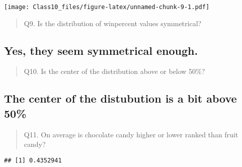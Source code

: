 \documentclass[
]{article}
\newenvironment{Shaded}{\begin{snugshade}}{\end{snugshade}}
\newcommand{\FunctionTok}[1]{\textcolor[rgb]{0.00,0.00,0.00}{#1}}
\newcommand{\NormalTok}[1]{#1}
\newcommand{\SpecialCharTok}[1]{\textcolor[rgb]{0.00,0.00,0.00}{#1}}
\begin{document}
\begin{Shaded}
\end{Shaded}

\texttt{[image: Class10\_files/figure-latex/unnamed-chunk-9-1.pdf]}

\begin{quote}
Q9. Is the distribution of winpercent values symmetrical?
\end{quote}

\hypertarget{yes-they-seem-symmetrical-enough.}{%
\subsection{Yes, they seem symmetrical
enough.}\label{yes-they-seem-symmetrical-enough.}}

\begin{quote}
Q10. Is the center of the distribution above or below 50\%?
\end{quote}

\hypertarget{the-center-of-the-distubution-is-a-bit-above-50}{%
\subsection{The center of the distubution is a bit above
50\%}\label{the-center-of-the-distubution-is-a-bit-above-50}}

\begin{quote}
Q11. On average is chocolate candy higher or lower ranked than fruit
candy?
\end{quote}

\begin{Shaded}
\end{Shaded}

\begin{verbatim}
## [1] 0.4352941
\end{verbatim}

\begin{Shaded}
\end{Shaded}
\end{document}
